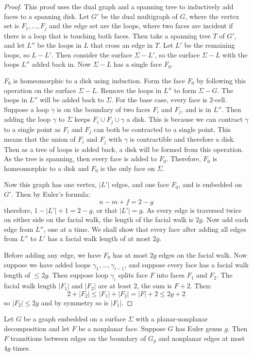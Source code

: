 \begin{proof}
	This proof uses the dual graph and a spanning tree to inductively add faces to a spanning disk. 
	Let \(G'\) be the dual multigraph of $G$, where the vertex set is \(F_1, \ldots, F_j\) and the edge set are the loops, where two faces are incident if there is a loop that is touching both faces. Then take a spanning tree \(T\) of \(G'\), and let \(L''\) be the loops in $L$ that cross an edge in \(T\). Let $L'$ be the remaining loops, so $L - L'$. 
	Then consider the surface \(\Sigma - L'\), so the surface $\Sigma - L$ with the loops $L''$ added back in. Now $\Sigma - L$ has a single face $F_0$.

	$F_0$ is homeomorphic to a disk using induction. Form the face $F_0$ by following this operation on the surface $\Sigma - L$. Remove the loops in $L''$ to form $\Sigma - G$. The loops in $L''$ will be added back to $\Sigma$. For the base case, every face is $2$-cell. Suppose a loop $\gamma$ is on the boundary of two faces $F_i$ and $F_j$, and is in $L''$. Then adding the loop $\gamma$ to $\Sigma$ keeps $F_i \cup F_j \cup \gamma$ a disk. This is because we can contract $\gamma$ to a single point as $F_i$ and $F_j$ can both be contracted to a single point. This means that the union of $F_i$ and $F_j$ with $\gamma$ is contractible and therefore a disk. Then as a tree of loops is added back, a disk will be formed from this operation. As the tree is spanning, then every face is added to $F_0$. Therefore, $F_0$ is homeomorphic to a disk and $F_0$ is the only face on $\Sigma$. 

	Now this graph has one vertex, \(|L'|\) edges, and one face \(F_0\), and is embedded on $G'$. Then by Euler's formula:
	\begin{equation}
		n - m + f = 2 - g
	\end{equation}
	therefore, \(1 - |L'| + 1 = 2 - g\), or that \(|L'| = g\). As every edge is traversed twice on either side on the facial walk, the length of the facial walk is \(2g\).
	Now add each edge from \(L''\), one at a time. We shall show that every face after adding all edges from \(L''\) to \(L'\) has a facial walk length of at most \(2g\).

	Before adding any edge, we have \(F_0\) has at most \(2g\) edges on the facial walk. Now suppose we have added loops \(\gamma_1, \ldots, \gamma_{i - 1}\), and suppose every face has a facial walk length of \(\leq 2g\).
	Then suppose loop \(\gamma_i\) splits face \(F\) into faces \(F_1\) and \(F_2\). The facial walk length \(|F_1|\) and \(|F_2|\) are at least 2, the sum is \(F + 2\). Then:
	\begin{equation}
		2 + |F_2| \leq |F_1| + |F_2| = |F| + 2 \leq 2g + 2
	\end{equation}
	so \(|F_2| \leq 2g\) and by symmetry so is \(|F_1|\).
\end{proof}
\begin{corollary}\label{corr:orientable_nonplanar_faces}
	Let \(G\) be a graph embedded on a surface \(\Sigma\) with a planar-nonplanar decomposition and let \(F\) be a nonplanar face. Suppose \(G\) has Euler genus \(g\). Then \(F\) transitions between edges on the boundary of $G_p$ and nonplanar edges at most $4g$ times.
\end{corollary}


